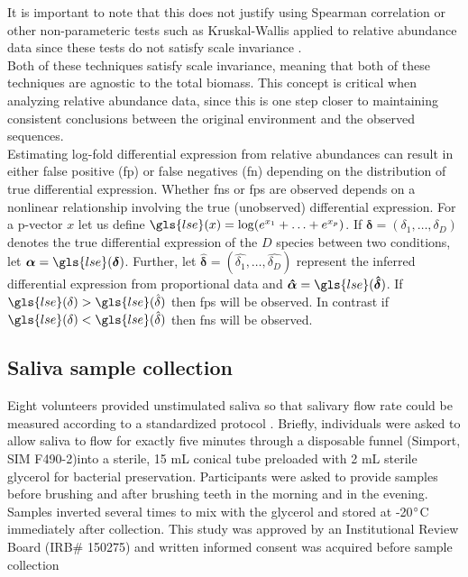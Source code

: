 It is important to note that this does not justify using Spearman correlation or other non-parameteric tests such as Kruskal-Wallis applied to relative abundance data since these tests do not satisfy scale invariance \cite{Friedman2012-cn}.\\[5 mm]
%
Both of these techniques satisfy scale invariance, meaning that both of these techniques are agnostic to the total biomass.  This concept is critical when analyzing relative abundance data, since this is one step closer to maintaining consistent conclusions between the original environment and the observed sequences.\\[5 mm]
%
Estimating log-fold differential expression from relative abundances can result in either false positive (\gls{fp}) or false negatives (\gls{fn}) depending on the distribution of true differential expression. Whether \gls{fn}s or \gls{fp}s are observed depends on a nonlinear relationship involving the true (unobserved) differential expression. For a p-vector $x$ let us define $\gls{lse}(x) = \log(e^{x_1}+ \ldots +e^{x_p})$. If $\bm{\delta}=(\delta_1, \ldots ,\delta_D)$ denotes the true differential expression of the $D$ species between two conditions, let $\bm{\alpha}=\gls{lse}(\bm{\delta})$. Further, let $\hat{\bm{\delta}}=(\hat{\delta_1}, \ldots, \hat{\delta_D})$ represent the inferred differential expression from proportional data and $\bm{\hat{\alpha}}=\gls{lse}(\bm{\hat{\delta}})$. If $\gls{lse}(\delta) > \gls{lse}(\hat{\delta})$ then \gls{fp}s will be observed. In contrast if $\gls{lse}(\delta) < \gls{lse}(\hat{\delta})$ then \gls{fn}s will be observed.\\[5 mm]
%
\subsection{Saliva sample collection}
Eight volunteers provided unstimulated saliva so that salivary flow rate could be measured according to a standardized protocol \cite{Navazesh2008-me}. Briefly, individuals were asked to allow saliva to flow for exactly five minutes through a disposable funnel (Simport, SIM F490-2)into a sterile, 15 mL conical tube preloaded with 2 mL sterile glycerol for bacterial preservation. Participants were asked to provide samples before brushing and after brushing teeth in the morning and in the evening. Samples inverted several times to mix with the glycerol and stored at -20$\degree$C immediately after collection. This study was approved by an Institutional Review Board (IRB\# 150275) and written informed consent was acquired before sample collection\\[5 mm]
%
